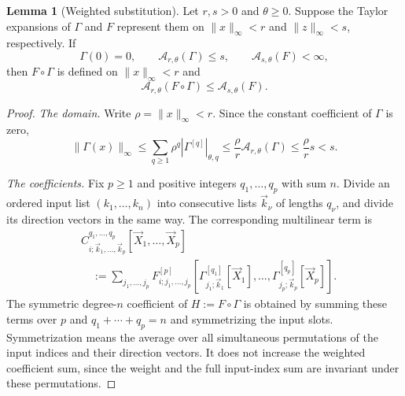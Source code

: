 \documentclass[10pt,reqno]{amsart}
\theoremstyle{definition}
\newtheorem{lemma}[definition]{Lemma}
\theoremstyle{remark}
\numberwithin{equation}{section}
\numberwithin{figure}{section}
\begin{document}
\begin{lemma}[Weighted substitution]\label{lem:weighted-substitution}
Let $r,s>0$ and $\theta\ge0$. Suppose the Taylor expansions of
$\Gamma$ and $F$ represent them on $\|x\|_\infty<r$ and
$\|z\|_\infty<s$, respectively. If
\begin{equation}\label{eq:weighted-substitution-inputs}
\Gamma(0)=0,\qquad\mathcal A_{r,\theta}(\Gamma)\le s,\qquad
\mathcal A_{s,\theta}(F)<\infty,
\end{equation}
then $F\circ\Gamma$ is defined on $\|x\|_\infty<r$ and
\begin{equation}\label{eq:weighted-substitution-bound}
\mathcal A_{r,\theta}(F\circ\Gamma)
\le\mathcal A_{s,\theta}(F).
\end{equation}
\end{lemma}
\begin{proof}
\emph{The domain.} Write $\rho=\|x\|_\infty<r$. Since the
constant coefficient of $\Gamma$ is zero,
\begin{equation}\label{eq:substitution-domain-calculation}
\|\Gamma(x)\|_\infty
\le\sum_{q\ge1}\rho^q|\Gamma^{[q]}|_{\theta,q}
\le\frac\rho r\mathcal A_{r,\theta}(\Gamma)
\le\frac\rho r s<s.
\end{equation}

\emph{The coefficients.} Fix $p\ge1$ and positive integers
$q_1,\ldots,q_p$ with sum $n$. Divide an ordered input list
$(k_1,\ldots,k_n)$ into consecutive lists $\vec k_\nu$ of lengths
$q_\nu$, and divide its direction vectors in the same way. The
corresponding multilinear term is
\begin{equation}\label{eq:substitution-multilinear-term}
\begin{aligned}
&C^{q_1,\ldots,q_p}_{i;\vec k_1,\ldots,\vec k_p}
[\vec X_1,\ldots,\vec X_p]\\
&\quad:=\sum_{j_1,\ldots,j_p}F^{[p]}_{i;j_1,\ldots,j_p}
\left[
\Gamma^{[q_1]}_{j_1;\vec k_1}[\vec X_1],\ldots,
\Gamma^{[q_p]}_{j_p;\vec k_p}[\vec X_p]
\right].
\end{aligned}
\end{equation}
The symmetric degree-$n$ coefficient of $H:=F\circ\Gamma$ is
obtained by summing these terms over $p$ and $q_1+\cdots+q_p=n$
and symmetrizing the input slots. Symmetrization means the average
over all simultaneous permutations of the input indices and their
direction vectors. It does not increase the weighted coefficient
sum, since the weight and the full input-index sum are invariant
under these permutations.


\end{proof}
\end{document}
